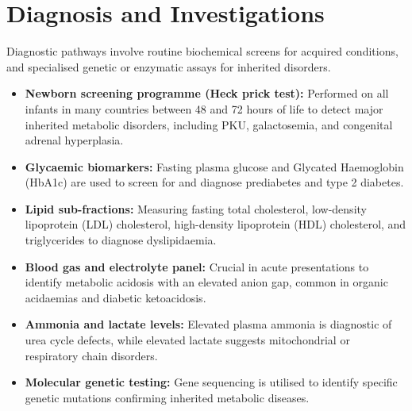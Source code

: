 \section*{Diagnosis and Investigations}
Diagnostic pathways involve routine biochemical screens for acquired conditions, and specialised genetic or enzymatic assays for inherited disorders.
\begin{itemize}
    \item \textbf{Newborn screening programme (Heck prick test):} Performed on all infants in many countries between 48 and 72 hours of life to detect major inherited metabolic disorders, including PKU, galactosemia, and congenital adrenal hyperplasia.
    \item \textbf{Glycaemic biomarkers:} Fasting plasma glucose and Glycated Haemoglobin (HbA1c) are used to screen for and diagnose prediabetes and type 2 diabetes.
    \item \textbf{Lipid sub-fractions:} Measuring fasting total cholesterol, low-density lipoprotein (LDL) cholesterol, high-density lipoprotein (HDL) cholesterol, and triglycerides to diagnose dyslipidaemia.
    \item \textbf{Blood gas and electrolyte panel:} Crucial in acute presentations to identify metabolic acidosis with an elevated anion gap, common in organic acidaemias and diabetic ketoacidosis.
    \item \textbf{Ammonia and lactate levels:} Elevated plasma ammonia is diagnostic of urea cycle defects, while elevated lactate suggests mitochondrial or respiratory chain disorders.
    \item \textbf{Molecular genetic testing:} Gene sequencing is utilised to identify specific genetic mutations confirming inherited metabolic diseases.
\end{itemize}

